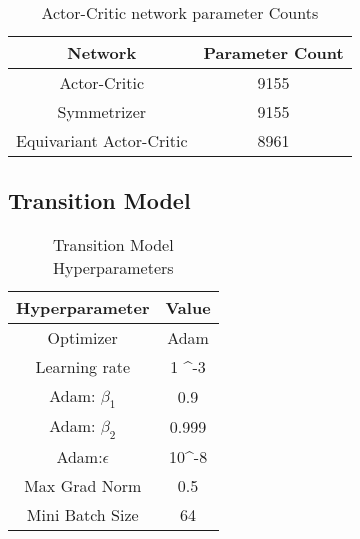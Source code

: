 \begin{table}[h!]\label{ap:parm}
	\centering
	\begin{tabular}{|c|c|}
		\hline
		Network                  & Parameter Count \\
		\hline
		Actor-Critic             & 9155            \\
		Symmetrizer              & 9155            \\
		Equivariant Actor-Critic & 8961
		\hline
	\end{tabular}
	\caption{Actor-Critic network parameter Counts}
\end{table}

\subsection{Transition Model}
\begin{table}[h!]\label{tab:hyp_tm}
	\centering
	\begin{tabular}{|c|c|}
		\hline
		Hyperparameter  & Value           \\
		\hline
		Optimizer       & Adam            \\
		Learning rate   & 1\cdot 10 ^{-3} \\
		Adam: $\beta_1$ & 0.9             \\
		Adam: $\beta_2$ & 0.999           \\
		Adam:$\epsilon$ & 10^{-8}         \\
		Max Grad Norm   & 0.5             \\
		Mini Batch Size & 64              \\
		\hline
	\end{tabular}
	\caption{Transition Model Hyperparameters}
\end{table}
